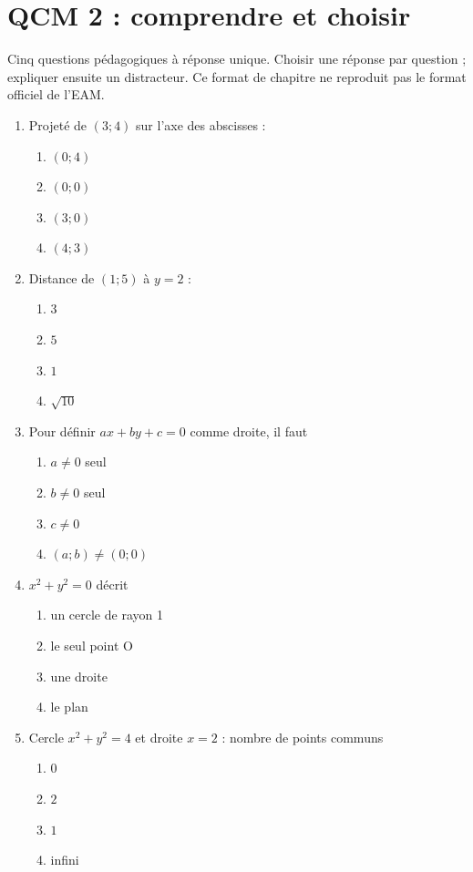 \endgroup
\begingroup\small
{}\section*{QCM 2 : comprendre et choisir}\label{C07-Q2}
Cinq questions pédagogiques à réponse unique. Choisir une réponse par question ; expliquer ensuite un distracteur. Ce format de chapitre ne reproduit pas le format officiel de l’EAM.
\begin{enumerate}
\item Projeté de $(3;4)$ sur l’axe des abscisses :
\begin{enumerate}[label=\Alph*.,itemsep=2pt]
\item $(0;4)$
\item $(0;0)$
\item $(3;0)$
\item $(4;3)$
\end{enumerate}
\item Distance de $(1;5)$ à $y=2$ :
\begin{enumerate}[label=\Alph*.,itemsep=2pt]
\item $3$
\item $5$
\item $1$
\item $\sqrt{10}$
\end{enumerate}
\item Pour définir $ax+by+c=0$ comme droite, il faut
\begin{enumerate}[label=\Alph*.,itemsep=2pt]
\item $a\ne0$ seul
\item $b\ne0$ seul
\item $c\ne0$
\item $(a;b)\ne(0;0)$
\end{enumerate}
\item $x^2+y^2=0$ décrit
\begin{enumerate}[label=\Alph*.,itemsep=2pt]
\item un cercle de rayon 1
\item le seul point O
\item une droite
\item le plan
\end{enumerate}
\item Cercle $x^2+y^2=4$ et droite $x=2$ : nombre de points communs
\begin{enumerate}[label=\Alph*.,itemsep=2pt]
\item $0$
\item $2$
\item $1$
\item infini
\end{enumerate}
\end{enumerate}
